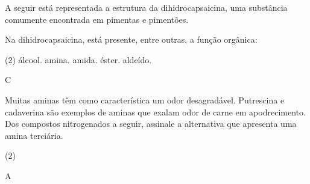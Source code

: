 \documentclass[11pt]{scrartcl}
\begin{document}
\begin{exercise}[points=1.0]
A seguir está representada a estrutura da dihidrocapsaicina, uma substância comumente encontrada em pimentas e pimentões.

\centerline{
}

Na dihidrocapsaicina, está presente, entre outras, a função orgânica:

\begin{choice}(2)
\choice álcool.
\choice amina.
\choice amida.
\choice éster.
\choice aldeído.
\end{choice}
\end{exercise}
\begin{solution}
C
\end{solution}





\begin{exercise}[points=1.0]
Muitas aminas têm como característica um odor desagradável. Putrescina e cadaverina são exemplos de aminas que exalam odor de carne em apodrecimento. Dos compostos nitrogenados a seguir, assinale a alternativa que apresenta uma amina terciária.



\begin{choice}(2)
\choice  {}
\choice {}
\choice {}
\choice {}
\choice {}
\end{choice}
\end{exercise}
\begin{solution}
A
\end{solution}
\end{document}
